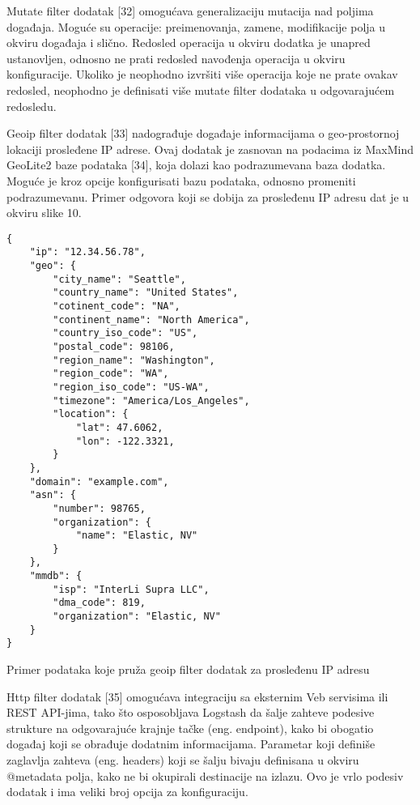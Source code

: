 \par
Mutate filter dodatak [32] omogućava generalizaciju mutacija nad poljima događaja. Moguće su operacije: preimenovanja, zamene, modifikacije polja u okviru događaja i slično. Redosled operacija u okviru dodatka je unapred ustanovljen, odnosno ne prati redosled navođenja operacija u okviru konfiguracije. Ukoliko je neophodno izvršiti više operacija koje ne prate ovakav redosled, neophodno je definisati više mutate filter dodataka u odgovarajućem redosledu. 

\par
Geoip filter dodatak [33] nadograđuje događaje informacijama o geo-prostornoj lokaciji prosleđene IP adrese. Ovaj dodatak je zasnovan na podacima iz MaxMind GeoLite2 baze podataka [34], koja dolazi kao podrazumevana baza dodatka. Moguće je kroz opcije konfigurisati bazu podataka, odnosno promeniti podrazumevanu. Primer odgovora koji se dobija za prosleđenu IP adresu dat je u okviru slike 10.

\begin{listing}[H]
\begin{verbatim}
{
    "ip": "12.34.56.78",
    "geo": {
        "city_name": "Seattle",
        "country_name": "United States",
        "cotinent_code": "NA",
        "continent_name": "North America",
        "country_iso_code": "US",
        "postal_code": 98106,
        "region_name": "Washington",
        "region_code": "WA",
        "region_iso_code": "US-WA",
        "timezone": "America/Los_Angeles",
        "location": {
            "lat": 47.6062,
            "lon": -122.3321,
        }
    },
    "domain": "example.com",
    "asn": {
        "number": 98765,
        "organization": {
            "name": "Elastic, NV"
        }
    },
    "mmdb": {
        "isp": "InterLi Supra LLC",
        "dma_code": 819,
        "organization": "Elastic, NV"
    }
}
\end{verbatim}
\caption{ Primer podataka koje pruža geoip filter dodatak za prosleđenu IP adresu}
\label{code:primer-podataka-koje-pruza-geoip-filter-dodatak-za-prosledjenu-ip-adresu}
\end{listing}

\par
Http filter dodatak [35] omogućava integraciju sa eksternim Veb servisima ili REST API-jima, tako što osposobljava Logstash da šalje zahteve podesive strukture na odgovarajuće krajnje tačke (eng. endpoint), kako bi obogatio događaj koji se obrađuje dodatnim informacijama. Parametar koji definiše zaglavlja zahteva (eng. headers) koji se šalju bivaju definisana u okviru @metadata polja, kako ne bi okupirali destinacije na izlazu. Ovo je vrlo podesiv dodatak i ima veliki broj opcija za konfiguraciju.

